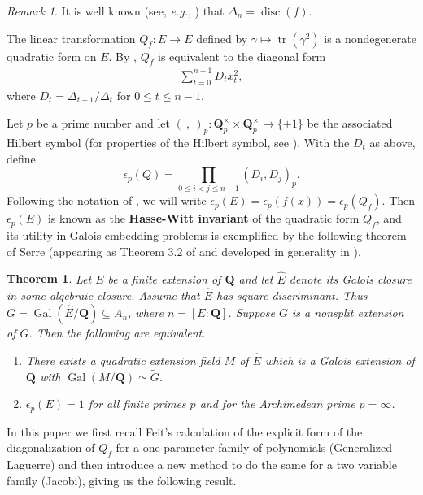 \documentclass{amsart}
\newcommand{\Gal}{\operatorname{Gal}}
\newcommand{\tr}{\operatorname{tr}}
\newcommand{\Q}{\mathbf{Q}}
\newcommand{\disc}{\operatorname{disc}}
\theoremstyle{plain}
\newtheorem{thm}[equation]{Theorem}
\theoremstyle{remark}
\newtheorem{rmk}[equation]{Remark}
\begin{document}
\begin{rmk} \label{disc_rem}
It is well known (see, \emph{e.g.}, \cite[Thm.~2.2]{feit}) that $\Delta_n = \disc (f)$.
\end{rmk}

The linear transformation $Q_f:E \to E$ defined by $\gamma \mapsto \tr(\gamma^2)$ is a nondegenerate quadratic form on $E$.  By \cite[Thm.~2.2]{feit}, $Q_f$ is equivalent to the diagonal form
\begin{align} \label{diag}
\sum_{t=0}^{n-1} D_tx_t^2,
\end{align}
where  $D_t = \Delta_{t+1}/\Delta_{t}$ for $0 \leq t \leq n-1$.  

Let $p$ be a prime number and let $(~,~)_p: \Q_p^\times \times \Q_p^\times \to \lbrace \pm 1 \rbrace$ be the associated  Hilbert symbol (for properties of the Hilbert symbol, see \cite[\S 3]{feit}).  With the $D_t$ as above, define
\[
\epsilon_p(Q) = \prod_{0 \leq i < j \leq n-1} (D_i,D_j)_p.
\]
Following the notation of \cite[\S3]{feit}, we will write $\epsilon_p(E) = \epsilon_p(f(x)) = \epsilon_p(Q_f)$.  Then $\epsilon_p(E)$ is known as the \textbf{Hasse-Witt invariant} of the quadratic form $Q_f$, and its utility in Galois embedding problems is exemplified by the following theorem of Serre (appearing as Theorem 3.2 of  \cite{feit} and developed in generality in  \cite[\S2]{serre}).

\begin{thm} \label{serre_thm}
Let $E$ be a finite extension of $\Q$ and let $\widehat{E}$ denote its Galois closure in some algebraic closure.  Assume that $\widehat{E}$ has square discriminant.  Thus $G = \Gal(\widehat{E}/\Q) \subseteq A_n$, where $n = [E:\Q]$.  Suppose $\widetilde{G}$ is a nonsplit extension of $G$.  Then the following are equivalent.
\begin{enumerate}
\item There exists a quadratic extension field $M$ of $\widehat{E}$ which is a Galois extension of $\Q$ with $\Gal(M/\Q) \simeq \widetilde{G}$.
\item $\epsilon_p(E) =1$ for all finite primes $p$ and for the Archimedean prime $p = \infty$.
\end{enumerate}
\end{thm}

In this paper we first recall Feit's calculation of the explicit form of the diagonalization of $Q_f$ for a one-parameter family of polynomials (Generalized Laguerre) and then introduce a new method to do the same for a two variable family (Jacobi), giving us the following result.
\end{document}
